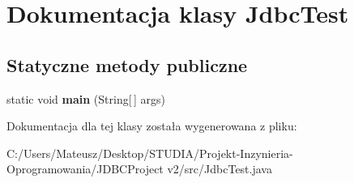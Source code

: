 \hypertarget{class_jdbc_test}{}\section{Dokumentacja klasy Jdbc\+Test}
\label{class_jdbc_test}
\subsection*{Statyczne metody publiczne}
\begin{DoxyCompactItemize}
\item 
\hypertarget{class_jdbc_test_a87e08226bd87e253e364287100408f80}{}static void {\bfseries main} (String\mbox{[}$\,$\mbox{]} args)\label{class_jdbc_test_a87e08226bd87e253e364287100408f80}

\end{DoxyCompactItemize}


Dokumentacja dla tej klasy została wygenerowana z pliku\+:\begin{DoxyCompactItemize}
\item 
C\+:/\+Users/\+Mateusz/\+Desktop/\+S\+T\+U\+D\+I\+A/\+Projekt-\/\+Inzynieria-\/\+Oprogramowania/\+J\+D\+B\+C\+Project v2/src/Jdbc\+Test.\+java\end{DoxyCompactItemize}
